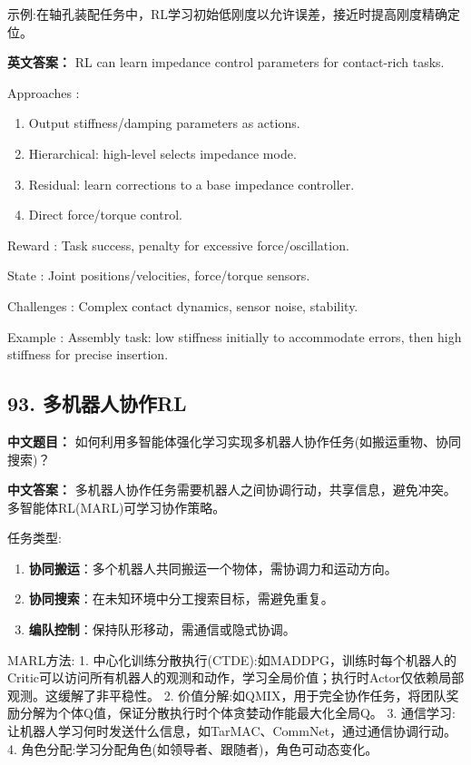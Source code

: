 \documentclass[10pt,a4paper]{ctexart}
\begin{document}
 示例:在轴孔装配任务中，RL学习初始低刚度以允许误差，接近时提高刚度精确定位。

\textbf{英文答案：}  
RL can learn impedance control parameters for contact-rich tasks.

 Approaches :
\begin{enumerate}
    \item Output stiffness/damping parameters as actions.
    \item Hierarchical: high-level selects impedance mode.
    \item Residual: learn corrections to a base impedance controller.
    \item Direct force/torque control.
\end{enumerate}

 Reward : Task success, penalty for excessive force/oscillation.

 State : Joint positions/velocities, force/torque sensors.

 Challenges : Complex contact dynamics, sensor noise, stability.

 Example : Assembly task: low stiffness initially to accommodate errors, then high stiffness for precise insertion.

\subsection*{93. 多机器人协作RL}
\textbf{中文题目：} 如何利用多智能体强化学习实现多机器人协作任务(如搬运重物、协同搜索)？

\textbf{中文答案：}  
多机器人协作任务需要机器人之间协调行动，共享信息，避免冲突。多智能体RL(MARL)可学习协作策略。

 任务类型:
\begin{enumerate}
    \item \textbf{协同搬运}：多个机器人共同搬运一个物体，需协调力和运动方向。
    \item \textbf{协同搜索}：在未知环境中分工搜索目标，需避免重复。
    \item \textbf{编队控制}：保持队形移动，需通信或隐式协调。
\end{enumerate}

 MARL方法:
1.  中心化训练分散执行(CTDE):如MADDPG，训练时每个机器人的Critic可以访问所有机器人的观测和动作，学习全局价值；执行时Actor仅依赖局部观测。这缓解了非平稳性。
2.  价值分解:如QMIX，用于完全协作任务，将团队奖励分解为个体Q值，保证分散执行时个体贪婪动作能最大化全局Q。
3.  通信学习:让机器人学习何时发送什么信息，如TarMAC、CommNet，通过通信协调行动。
4.  角色分配:学习分配角色(如领导者、跟随者)，角色可动态变化。
\end{document}
